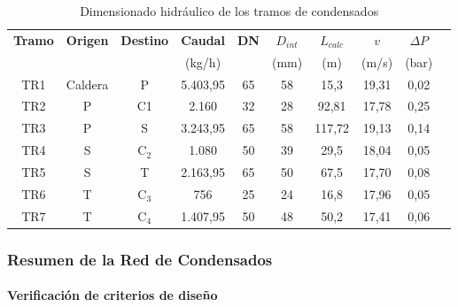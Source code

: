 \documentclass[12pt]{article}
\begin{document}
\begin{table}[H]
	\centering
	\caption{Dimensionado hidráulico de los tramos de condensados}
	\label{tab:dimensionado-condensados}
	\begin{tabular}{cccccccccc}
		\toprule
		\textbf{Tramo} & \textbf{Origen} & \textbf{Destino} & \textbf{Caudal} & \textbf{DN} & \textbf{$D_{int}$} & \textbf{$L_{calc}$} & \textbf{$v$} & \textbf{$\Delta P$} \\
		               &                 &                  & (kg/h)          &             & (mm)               & (m)                 & (m/s)        & (bar)               \\
		\midrule
		TR1            & Caldera         & P                & 5.403{,}95      & 65          & 58                 & 15{,}3              & 19{,}31      & 0{,}02              \\
		TR2            & P               & C1            & 2.160           & 32          & 28                 & 92{,}81             & 17{,}78      & 0{,}25              \\
		TR3            & P               & S                & 3.243{,}95      & 65          & 58                 & 117{,}72            & 19{,}13      & 0{,}14              \\
		TR4            & S               & C$_2$            & 1.080           & 50          & 39                 & 29{,}5              & 18{,}04      & 0{,}05              \\
		TR5            & S               & T                & 2.163{,}95      & 65          & 50                 & 67{,}5              & 17{,}70      & 0{,}08              \\
		TR6            & T               & C$_3$            & 756             & 25          & 24                 & 16{,}8              & 17{,}96      & 0{,}05              \\
		TR7            & T               & C$_4$            & 1.407{,}95      & 50          & 48                 & 50{,}2              & 17{,}41      & 0{,}06              \\
		\bottomrule
	\end{tabular}
\end{table}


\subsubsection{Resumen de la Red de Condensados}
\label{subsubsec:resumen-condensados}

\paragraph{Verificación de criterios de diseño}
\end{document}
